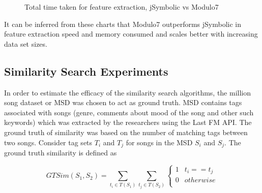 \documentclass{article}
\begin{document}
\begin{figure}[h]
\begin{center}
{}
 \caption{Total time taken for feature extraction, jSymbolic vs Modulo7}
 \label{fig:TimeTaken}
\end{center}
\end{figure}

\noindent It can be inferred from these charts that Modulo7 outperforms jSymbolic in feature extraction speed and memory consumed and scales better with increasing data set sizes. 

\subsection{Similarity Search Experiments}

\noindent In order to estimate the efficacy of the similarity search algorithms, the million song dataset or MSD \cite{msd} was chosen to act as ground truth. MSD contains tags associated with songs (genre, comments about mood of the song and other such keywords) which was extracted by the researchers using the Last FM API. The ground truth of similarity was based on the number of matching tags between two songs. Consider tag sets $T_i$ and $T_j$ for songs in the MSD $S_i$ and $S_j$. The ground truth similarity is defined as 

\begin{equation} \label{taghitrate}
GTSim(S_1, S_2) = \sum_{t_i \in T(S_1)} \sum_{t_j \in T(S_2)} \begin{cases} 
      1 & t_i == t_j \\
      0 & otherwise \\  \end{cases}
\end{equation}
\end{document}
